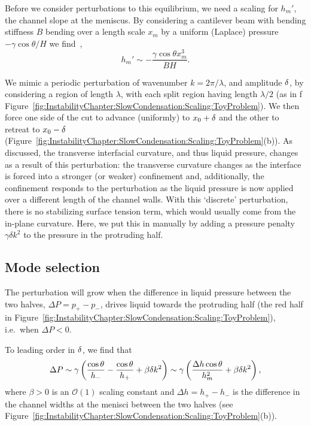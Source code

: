 Before we consider perturbations to this equilibrium, we need a scaling for $h_m'$, the channel slope at the meniscus. By considering a cantilever beam with bending stiffness $B$ bending over a length scale $x_m$ by a uniform (Laplace) pressure $-\gamma \cos \theta / H$ we find~\citep{Timoshenko1959},
\begin{equation}\label{E:InstabilityChapter:Scaling:hmprimed}
h_m' \sim -\frac{\gamma \cos \theta x_m^3}{B H}.
\end{equation}

We mimic a periodic perturbation of wavenumber $k = 2\pi/\lambda$, and amplitude $\delta$, by considering a region of length $\lambda$, with each split region having length $\lambda/2$ (as in f
Figure~\ref{fig:InstabilityChapter:SlowCondensation:Scaling:ToyProblem}). We then force one side of the cut to advance (uniformly) to $x_0 + \delta$ and the other to retreat to $x_0 - \delta$ (Figure~\ref{fig:InstabilityChapter:SlowCondensation:Scaling:ToyProblem}(b)). As discussed, the transverse interfacial curvature, and thus liquid pressure, changes as a result of this perturbation: the transverse curvature changes as the interface is forced into a stronger (or weaker) confinement and, additionally, the confinement responds to the perturbation as the liquid pressure is now applied over a different length of the channel walls. With this `discrete' perturbation, there is no stabilizing surface tension term, which would usually come from the in-plane curvature. Here, we put this in manually by adding a pressure penalty $\gamma \delta k^2$ to the pressure in the protruding half.

\subsection{Mode selection}
The perturbation will grow when the difference in liquid pressure between the two halves, $\Delta P = p_+ - p_-$, drives liquid towards the protruding half (the red half in Figure~\ref{fig:InstabilityChapter:SlowCondensation:Scaling:ToyProblem}), i.e.~when $\Delta P<0$.

To leading order in $\delta$, we find that
\begin{equation}\label{E:InstabilityChapter:Scaling:DeltaP_preliminary}
\Delta P\sim \gamma\left(\frac{\cos \theta}{h_-} - \frac{ \cos \theta}{h_+} + \beta \delta k^2\right) \sim \gamma \left(\frac{\Delta h \cos \theta}{h_m^2} + \beta \delta k^2\right),
\end{equation}
where $\beta>0$ is an $\mathcal{O}(1)$ scaling constant and $\Delta h = h_+ - h_- $ is the difference in the channel widths at the menisci between the two halves (see Figure~\ref{fig:InstabilityChapter:SlowCondensation:Scaling:ToyProblem}(b)).

